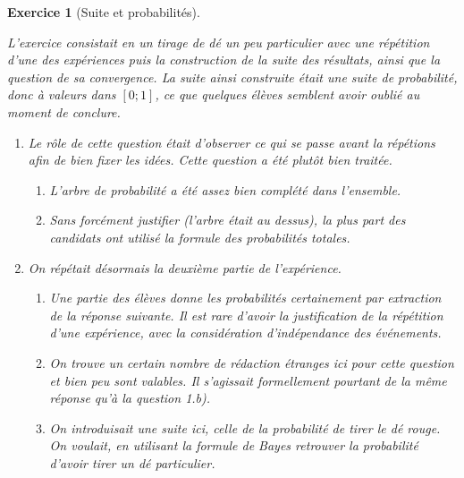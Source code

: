 \documentclass[12pt,a4paper]{article}
\theoremstyle{break}
\theoremstyle{nobreak}
\newtheorem{exercice}{Exercice}
\theoremstyle{nonumberplain}
\begin{document}
\begin{exercice}[Suite et probabilités]~

  L'exercice consistait en un tirage de dé un peu particulier avec une
  répétition d'une des expériences puis la construction de la suite des
  résultats, ainsi que la question de sa convergence. La suite ainsi
  construite était une suite de probabilité, donc à valeurs dans
  $\left[0;1\right]$, ce que quelques élèves semblent avoir oublié au
  moment de conclure.

  \begin{enumerate}
    \item Le rôle de cette question était d'observer ce qui se passe
      avant la répétions afin de bien fixer les idées. Cette question a
      été plutôt bien traitée.
      \begin{enumerate}
        \item L'arbre de probabilité a été assez bien complété dans
          l'ensemble.
        \item Sans forcément justifier (l'arbre était au dessus), la
          plus part des candidats ont utilisé la formule des
          probabilités totales.
      \end{enumerate}
    \item On répétait désormais la deuxième partie de l'expérience.
      \begin{enumerate}
        \item Une partie des élèves donne les probabilités certainement
          par extraction de la réponse suivante. Il est rare d'avoir
          la justification de la répétition d'une expérience, avec la
          considération d'indépendance des événements.
        \item On trouve un certain nombre de rédaction étranges ici pour
          cette question et bien peu sont valables. Il s'agissait
          formellement pourtant de la même réponse qu'à la question
          1.b).
        \item On introduisait une suite ici, celle de la probabilité de
          tirer le dé rouge. On voulait, en utilisant la formule de
          Bayes retrouver la probabilité d'avoir tirer un dé
          particulier.


\end{enumerate}
\end{enumerate}
\end{exercice}
\end{document}

